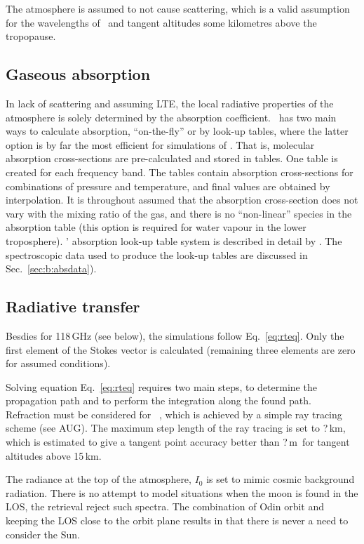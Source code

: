 The atmosphere is assumed to not cause scattering, which is a valid assumption
for the wavelengths of \smr\ and tangent altitudes some kilometres above the
tropopause. 


\subsection{Gaseous absorption}
%
In lack of scattering and assuming LTE, the local radiative properties of the
atmosphere is solely determined by the absorption coefficient. \ARTS\ has two
main ways to calculate absorption, ``on-the-fly'' or by look-up tables, where
the latter option is by far the most efficient for simulations of \smr. That
is, molecular absorption cross-sections are pre-calculated and stored in
tables. One table is created for each frequency band. The tables contain
absorption cross-sections for combinations of pressure and temperature, and
final values are obtained by interpolation. It is throughout assumed that the
absorption cross-section does not vary with the mixing ratio of the gas, and
there is no ``non-linear'' species in the absorption table (this option is
required for water vapour in the lower troposphere).
\ARTS' absorption look-up table system is described in detail by
\citet{buehler:absor:11}. The spectroscopic data used to produce the look-up
tables are discussed in Sec.~\ref{sec:b:absdata}).


\subsection{Radiative transfer}
%
Besdies for 118\,GHz (see below), the simulations follow Eq.~\ref{eq:rteq}. Only
the first element of the Stokes vector is calculated (remaining three elements
are zero for assumed conditions).

Solving equation Eq.~\ref{eq:rteq} requires two main steps, to determine the
propagation path and to perform the integration along the found path.
Refraction must be considered for \smr\ \citep{eriksson:studi:02}, which is
achieved by a simple ray tracing scheme (see AUG). The maximum step length of
the ray tracing is set to ?\,km, which is estimated to give a
tangent point accuracy better than ?\,m\ for tangent altitudes
above 15\,km.

The radiance at the top of the atmosphere, $I_0$ is set to mimic cosmic
background radiation. There is no attempt to model situations when the moon is
found in the LOS, the retrieval reject such spectra. The
combination of Odin orbit and keeping the LOS close to the orbit plane results
in that there is never a need to consider the Sun.



